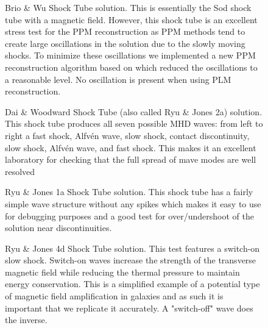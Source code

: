 \begin{figure}[ht!]
    \caption{Brio \& Wu Shock Tube solution. This is essentially the Sod shock tube with a magnetic field. However, this shock tube is an excellent stress test for the PPM reconstruction as PPM methods tend to create large oscillations in the solution due to the slowly moving shocks. To minimize these oscillations we implemented a new PPM reconstruction algorithm based on \cite{felker_2020} which reduced the oscillations to a reasonable level. No oscillation is present when using PLM reconstruction.
    }
    \label{fig:brio-and-wu}
\end{figure}

\begin{figure}[ht!]
    \caption{Dai \& Woodward Shock Tube (also called Ryu \& Jones 2a) solution. This shock tube produces all seven possible MHD waves: from left to right a fast shock, Alfvén wave, slow shock, contact discontinuity, slow shock, Alfvén wave, and fast shock. This makes it an excellent laboratory for checking that the full spread of mave modes are well resolved
    }
    \label{fig:dai-and-woodward}
\end{figure}

\begin{figure}[ht!]
    \caption{Ryu \& Jones 1a Shock Tube solution. This shock tube has a fairly simple wave structure without any spikes which makes it easy to use for debugging purposes and a good test for over/undershoot of the solution near discontinuities.
    }
    \label{fig:rj-1a}
\end{figure}

\begin{figure}[ht!]
    \caption{Ryu \& Jones 4d Shock Tube solution. This test features a switch-on slow shock. Switch-on waves increase the strength of the transverse magnetic field while reducing the thermal pressure to maintain energy conservation. This is a simplified example of a potential type of magnetic field amplification in galaxies and as such it is important that we replicate it accurately. A "switch-off" wave does the inverse.
    }
    \label{fig:rj-4d}
\end{figure}

